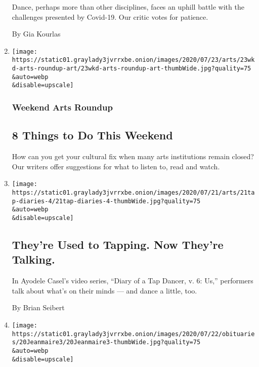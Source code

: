 \begin{enumerate}
  Dance, perhaps more than other disciplines, faces an uphill battle
  with the challenges presented by Covid-19. Our critic votes for
  patience.

  By Gia Kourlas
\item
  \href{/2020/07/23/arts/things-to-do-weekend-coronavirus.html}{}

  \texttt{[image: https://static01.graylady3jvrrxbe.onion/images/2020/07/23/arts/23wkd-arts-roundup-art/23wkd-arts-roundup-art-thumbWide.jpg?quality=75\\\&auto=webp\\\&disable=upscale]}

  \hypertarget{weekend-arts-roundup}{%
  \subsubsection{Weekend Arts Roundup}\label{weekend-arts-roundup}}

  \hypertarget{8-things-to-do-this-weekend}{%
  \subsection{8 Things to Do This
  Weekend}\label{8-things-to-do-this-weekend}}

  How can you get your cultural fix when many arts institutions remain
  closed? Our writers offer suggestions for what to listen to, read and
  watch.
\item
  \href{/2020/07/21/arts/dance/ayodele-casel-diary-of-a-tap-dancer.html}{}

  \texttt{[image: https://static01.graylady3jvrrxbe.onion/images/2020/07/21/arts/21tap-diaries-4/21tap-diaries-4-thumbWide.jpg?quality=75\\\&auto=webp\\\&disable=upscale]}

  \hypertarget{theyre-used-to-tapping-now-theyre-talking}{%
  \subsection{They're Used to Tapping. Now They're
  Talking.}\label{theyre-used-to-tapping-now-theyre-talking}}

  In Ayodele Casel's video series, ``Diary of a Tap Dancer, v. 6: Us,''
  performers talk about what's on their minds --- and dance a little,
  too.

  By Brian Seibert
\item
  \href{/2020/07/21/arts/dance/zizi-jeanmaire-french-star-of-ballet-cabaret-and-film-dies-at-96.html}{}

  \texttt{[image: https://static01.graylady3jvrrxbe.onion/images/2020/07/22/obituaries/20Jeanmaire3/20Jeanmaire3-thumbWide.jpg?quality=75\\\&auto=webp\\\&disable=upscale]}


\end{enumerate}
